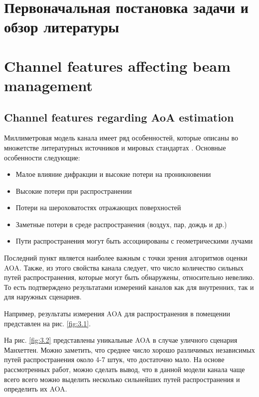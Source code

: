

\section{Первоначальная постановка задачи и обзор литературы}
\label{cha:ch_1}

\section{Channel features affecting beam management}
\subsection{Channel features regarding AoA estimation}
Миллиметровая модель канала имеет ряд особенностей, которые описаны во множетстве
литературных источников и мировых стандартах \cite{Maltsev2010, Maltsev2017,
Xu2002, Akdeniz2014, Rappaport2015}. Основные особенности следующие:
\begin{itemize}
    \item Малое влияние дифракции и высокие потери на проникновении
    \item Высокие потери при распространении
    \item Потери на шероховатостях отражающих поверхностей
    \item Заметные потери в среде распространения (воздух, пар, дождь и др.)
    \item Пути распространения могут быть ассоциированы с геометрическими лучами
\end{itemize}

Последний пункт является наиболее важным с точки зрения алгоритмов оценки AOA.
Также, из этого свойства канала следует, что число
количество сильных путей распространения, которые могут быть обнаружены, относительно невелико. То есть
подтверждено результатами измерений каналов как для внутренних, так и для наружных сценариев.

Например, результаты измерения AOA для распространения в помещении
представлен на рис. \ref{fig:3.1}.

На рис. \ref{fig:3.2} представлены уникальные AOA в случае уличного сценария
Манхеттен. Можно заметить, что среднее число хорошо различимых независимых
путей распространения около 4-7 штук, что достаточно мало. 
На основе рассмотренных работ, можно сделать вывод, что в данной модели канала 
чаще всего всего можно выделить несколько сильнейших путей распространения и
определить их AOA.

